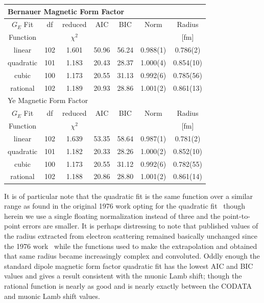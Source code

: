 \documentclass[10pt,aps,prc,twocolumn]{revtex4-1}
\begin{document}
\begin{table}
\begin{tabular}{ccccccc}
\multicolumn{6}{l}{Bernauer Magnetic Form Factor}      \\  \hline
$G_E$ Fit & df  &reduced   & AIC    & BIC   & Norm & Radius    \\  
Function  &     &$\chi^2$  &        &       &               & [fm]      \\  \hline
linear    & 102 &1.601     & 50.96  & 56.24 & 0.988(1)  & 0.786(2)     \\
quadratic & 101 &1.183     & 20.43  & 28.37 & 1.000(4)  & 0.854(10)    \\ 
cubic     & 100 &1.173     & 20.55  & 31.13 & 0.992(6)  & 0.785(56)    \\ 
rational  & 102 &1.189     & 20.93  & 28.86 & 1.001(2)  & 0.861(13)    \\    \hline \hline
\multicolumn{6}{l}{Ye Magnetic Form Factor}                    \\ \hline
$G_E$ Fit & df  & reduced  & AIC    & BIC   & Norm     & Radius    \\  
Function  &     &$\chi^2$  &        &       &          & [fm]      \\  \hline
linear    & 102 &1.639 & 53.35  & 58.64 & 0.987(1) & 0.781(2)  \\
quadratic & 101 &1.182 & 20.33  & 28.26 & 1.000(2) & 0.852(10) \\
cubic     & 100 &1.173 & 20.55  & 31.12 & 0.992(6) & 0.782(55) \\ 
rational  & 102 &1.188 & 20.86  & 28.80 & 1.001(2) & 0.861(14) \\    \hline \hline
\end{tabular}
\label{datatable}
\end{table}


It is of particular note that the quadratic fit is the same function over a similar range as found in the original 1976 work opting for
the quadratic fit~\cite{Borkowski:1975} though herein we use a single floating normalization 
instead of three and the point-to-point errors are smaller.   It is perhaps distressing to note that published values of the 
radius extracted from electron scattering remained basically unchanged since the 1976 work~\cite{Borkowski:1975} while the 
functions used to make the extrapolation and obtained that same radius became increasingly complex and convoluted.
Oddly enough the standard dipole magnetic form factor quadratic fit has the lowest AIC and BIC values and gives a result consistent
with the muonic Lamb shift; though the rational function is nearly as good and is nearly exactly between the CODATA
and muonic Lamb shift values.    
\end{document}
